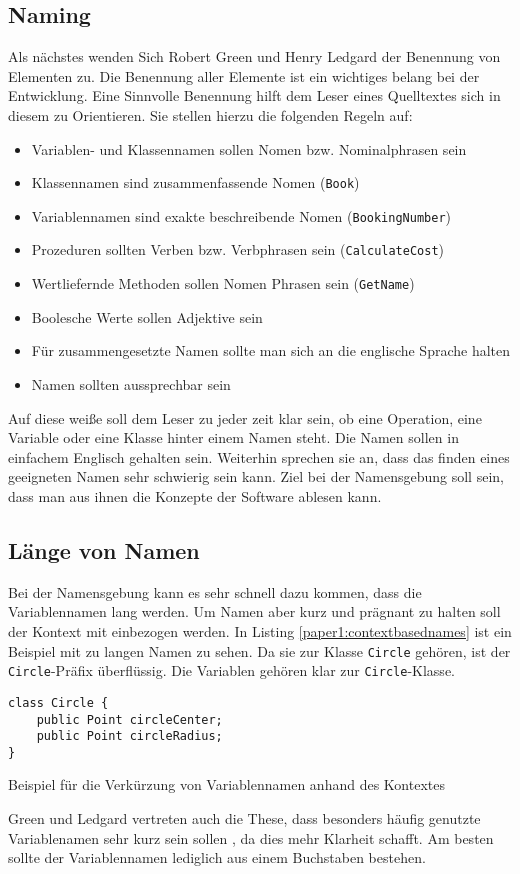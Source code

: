 \subsection{Naming}
\label{paper1:naming}
Als nächstes wenden Sich Robert Green und Henry Ledgard der Benennung von Elementen zu\cite[S. 3f.]{Green}. Die Benennung aller Elemente ist ein wichtiges belang bei der Entwicklung. Eine Sinnvolle Benennung hilft dem Leser eines Quelltextes sich in diesem zu Orientieren. Sie stellen hierzu die folgenden Regeln auf\cite[S. 4]{Green}:
\begin{itemize}
    \item Variablen- und Klassennamen sollen Nomen bzw. Nominalphrasen sein
    \item Klassennamen sind zusammenfassende Nomen (\texttt{Book})
    \item Variablennamen sind exakte beschreibende Nomen (\texttt{BookingNumber})
    \item Prozeduren sollten Verben bzw. Verbphrasen sein (\texttt{CalculateCost})
    \item Wertliefernde Methoden sollen Nomen Phrasen sein (\texttt{GetName})
    \item Boolesche Werte sollen Adjektive sein
    \item Für zusammengesetzte Namen sollte man sich an die englische Sprache halten
    \item Namen sollten aussprechbar sein
\end{itemize}

Auf diese weiße soll dem Leser zu jeder zeit klar sein, ob eine Operation, eine Variable oder eine Klasse hinter einem Namen steht. Die Namen sollen in einfachem Englisch gehalten sein.
Weiterhin sprechen sie an, dass das finden eines geeigneten Namen sehr schwierig sein kann. Ziel bei der Namensgebung soll sein, dass man aus ihnen die Konzepte der Software ablesen kann.

\subsection{Länge von Namen}
Bei der Namensgebung kann es sehr schnell dazu kommen, dass die Variablennamen lang werden. Um Namen aber kurz und prägnant zu halten soll der Kontext mit einbezogen werden. In Listing \ref{paper1:contextbasednames} ist ein Beispiel mit zu langen Namen zu sehen. Da sie zur Klasse \texttt{Circle} gehören, ist der \texttt{Circle}-Präfix überflüssig. Die Variablen gehören klar zur \texttt{Circle}-Klasse.
\cite[S. 4f.]{Green}
\begin{listing}[H]
    \begin{verbatim}
class Circle {
    public Point circleCenter;
    public Point circleRadius;
}
    \end{verbatim}
    \caption{Beispiel für die Verkürzung von Variablennamen anhand des Kontextes}
    \label{paper1:contextbasednames}
\end{listing}
Green und Ledgard vertreten auch die These, dass besonders häufig genutzte Variablenamen sehr kurz sein sollen \cite[S. 6]{Green}, da dies mehr Klarheit schafft. Am besten sollte der Variablennamen lediglich aus einem Buchstaben bestehen.

